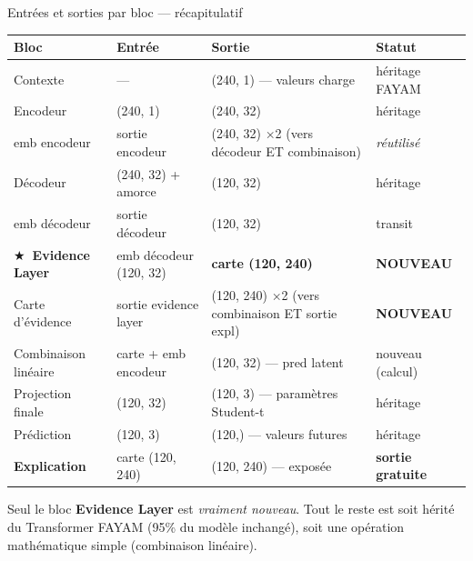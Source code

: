 \documentclass[10pt]{beamer}
\begin{document}
\begin{frame}{Entrées et sorties par bloc — récapitulatif}
  \begin{tcolorbox}[colback=blue!3, colframe=blue!50!black, arc=2mm, fonttitle=\bfseries,
                    title={Tenseurs traversant le modèle ($d_{\text{model}}=32$, ctx=240, pred=120)}]
    \tiny
    \begin{tabular}{p{2.0cm}p{3.5cm}p{4cm}p{2.0cm}}
      \toprule
      \textbf{Bloc} & \textbf{Entrée} & \textbf{Sortie} & \textbf{Statut} \\
      \midrule
      Contexte             & — & (240, 1) — valeurs charge & héritage FAYAM \\
      Encodeur             & (240, 1) & (240, 32) & héritage \\
      emb encodeur         & sortie encodeur & (240, 32) ×2 (vers décodeur ET combinaison) & \emph{réutilisé} \\
      Décodeur             & (240, 32) + amorce & (120, 32) & héritage \\
      emb décodeur         & sortie décodeur & (120, 32) & transit \\
      \textbf{\ensuremath{\bigstar}\ Evidence Layer} & emb décodeur (120, 32) & \textbf{carte (120, 240)} & \textbf{NOUVEAU} \\
      Carte d'évidence    & sortie evidence layer & (120, 240) ×2 (vers combinaison ET sortie expl) & \textbf{NOUVEAU} \\
      Combinaison linéaire & carte + emb encodeur & (120, 32) — pred latent & nouveau (calcul) \\
      Projection finale    & (120, 32) & (120, 3) — paramètres Student-t & héritage \\
      Prédiction           & (120, 3) & (120,) — valeurs futures & héritage \\
      \textbf{Explication}  & carte (120, 240) & (120, 240) — exposée & \textbf{sortie gratuite} \\
      \bottomrule
    \end{tabular}
  \end{tcolorbox}

  \begin{tcolorbox}[colback=newcontrib!5, colframe=newcontrib!70!black, arc=2mm, fonttitle=\bfseries,
                    title=Lecture clé]
    Seul le bloc \textbf{Evidence Layer} est \emph{vraiment nouveau}.
    Tout le reste est soit hérité du Transformer FAYAM (95\% du modèle inchangé),
    soit une opération mathématique simple (combinaison linéaire).
  \end{tcolorbox}
\end{frame}
\end{document}

